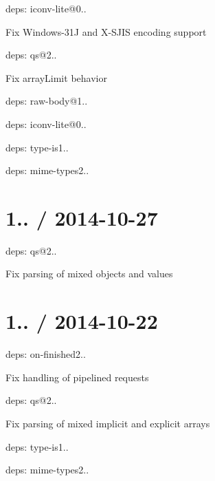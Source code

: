 \begin{DoxyItemize}
\item deps\+: iconv-\/lite@0..
\begin{DoxyItemize}
\item Fix Windows-\/31J and X-\/\+S\+J\+IS encoding support
\end{DoxyItemize}
\item deps\+: qs@2..
\begin{DoxyItemize}
\item Fix {\ttfamily array\+Limit} behavior
\end{DoxyItemize}
\item deps\+: raw-\/body@1..
\begin{DoxyItemize}
\item deps\+: iconv-\/lite@0..
\end{DoxyItemize}
\item deps\+: type-\/is1..
\begin{DoxyItemize}
\item deps\+: mime-\/types2..
\end{DoxyItemize}
\end{DoxyItemize}

\section*{1.. / 2014-\/10-\/27 }


\begin{DoxyItemize}
\item deps\+: qs@2..
\begin{DoxyItemize}
\item Fix parsing of mixed objects and values
\end{DoxyItemize}
\end{DoxyItemize}

\section*{1.. / 2014-\/10-\/22 }


\begin{DoxyItemize}
\item deps\+: on-\/finished2..
\begin{DoxyItemize}
\item Fix handling of pipelined requests
\end{DoxyItemize}
\item deps\+: qs@2..
\begin{DoxyItemize}
\item Fix parsing of mixed implicit and explicit arrays
\end{DoxyItemize}
\item deps\+: type-\/is1..
\begin{DoxyItemize}
\item deps\+: mime-\/types2..
\end{DoxyItemize}
\end{DoxyItemize}

